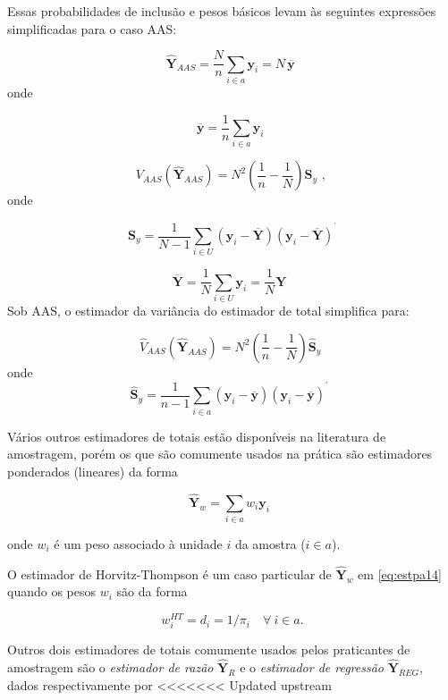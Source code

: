 \documentclass[
  12pt,
  brazilian,
]{book}
\theoremstyle{definition}
\theoremstyle{definition}
\theoremstyle{definition}
\theoremstyle{definition}
\theoremstyle{remark}
\begin{document}
Essas probabilidades de inclusão e pesos básicos levam às seguintes expressões simplificadas para o caso AAS:

\[
\widehat{\mathbf{Y}}_{AAS} = \frac{N}{n} \sum_{i \in a} \mathbf{y}_i = N \, \overline{\mathbf{y}}  \,\, \label{eq:estpa7}
\]
onde

\[
\overline{\mathbf{y}} = \frac{1}{n} \sum_{i \in a} \mathbf{y}_i  \,\, \label{eq:estpa8}
\]

\[
V_{AAS} \left( \mathbf{\widehat{Y}}_{AAS} \right) = N^{2} \left( \frac{1}{n} - \frac{1}{N} \right) \mathbf{S}_y \mbox{ ,}  \,\, \label{eq:estpa9}
\]
onde

\[
\mathbf{S}_y = \frac{1}{N-1} \sum_{i \in U} \left( \mathbf{y}_i - \overline{ \mathbf{Y}} \right) \left( \mathbf{y}_i - \overline{\mathbf{Y}} \right) ^{^{\prime }}   \label{eq:estpa10}
\]

\[
\overline{\mathbf{Y}} = \frac{1}{N} \sum_{i \in U} \mathbf{y}_i = \frac{1}{N} \mathbf{Y} \,\,\, \label{eq:estpa11}
\]
Sob AAS, o estimador da variância do estimador de total simplifica para:

\[
\widehat{V}_{AAS} \left( \mathbf{\widehat{Y}}_{AAS} \right) = N^{2} \left( \frac{1}{n} - \frac{1}{N} \right) \mathbf{\widehat S}_y \,\, \label{eq:estpa12}
\]
onde
\[
\widehat{\mathbf{S}}_y = \frac{1}{n-1} \sum_{i \in a} \left( \mathbf{y}_i - \overline{\mathbf{y}} \right) \left( \mathbf{y}_i - \overline{\mathbf{y}} \right) ^{^{\prime }} \,\,\, \label{eq:estpa13} 
\]

Vários outros estimadores de totais estão disponíveis na literatura de amostragem, porém os que são comumente usados na prática são estimadores ponderados (lineares) da forma

\[
\mathbf{\widehat{Y}}_w = \sum\limits_{i \in a} w_i \mathbf{y}_i  \,\,\, \label{eq:estpa14}
\]

onde \(w_i\) é um peso associado à unidade \(i\) da amostra (\(i \in a\)).

O estimador de Horvitz-Thompson é um caso particular de \(\mathbf{\widehat{Y}}_w\) em \eqref{eq:estpa14} quando os pesos \(w_i\) são da forma

\[
w_i^{HT} = d_i = 1 / \pi_i \quad \forall \ i \in a. 
\]

Outros dois estimadores de totais comumente usados pelos praticantes de amostragem são o \emph{estimador de razão} \(\mathbf{\widehat{Y}}_R\) e o \emph{estimador de regressão} \(\mathbf{\widehat{Y}}_{REG}\), dados respectivamente por
\textless\textless\textless\textless\textless\textless\textless{} Updated upstream
\end{document}
